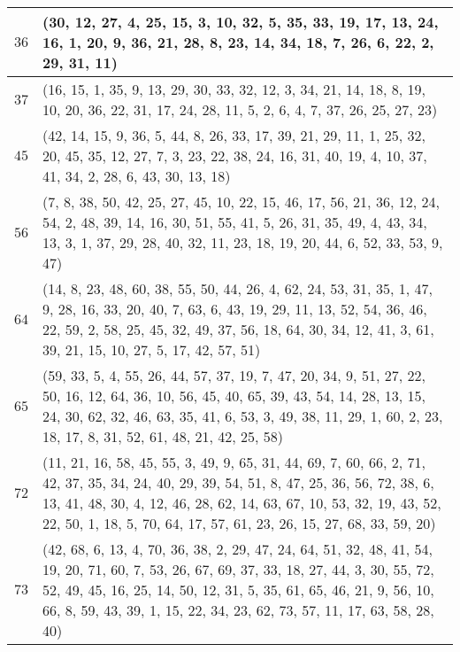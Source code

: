 \documentclass{article}
\theoremstyle{remark}
\theoremstyle{plain}
\begin{document}
\begin{appendices}
\begin{table}[H]
\begin{tabular}{ ||c p{14.3cm}|| }
    \hline
    
    $36$ & (30, 12, 27, 4, 25, 15, 3, 10, 32, 5, 35, 33, 19, 17, 13, 24, 16, 1, 20, 9, 36, 21, 28, 8, 23, 14, 34, 18, 7, 26, 6, 22, 2, 29, 31, 11) \\

    \hline
    
    $37$ & (16, 15, 1, 35, 9, 13, 29, 30, 33, 32, 12, 3, 34, 21, 14, 18, 8, 19, 10, 20, 36, 22, 31, 17, 24, 28, 11, 5, 2, 6, 4, 7, 37, 26, 25, 27, 23) \\

    \hline
    
    $45$ & (42, 14, 15, 9, 36, 5, 44, 8, 26, 33, 17, 39, 21, 29, 11, 1, 25, 32, 20, 45, 35, 12, 27, 7, 3, 23, 22, 38, 24, 16, 31, 40, 19, 4, 10, 37, 41, 34, 2, 28, 6, 43, 30, 13, 18) \\
    
    \hline
    
    $56$ & (7, 8, 38, 50, 42, 25, 27, 45, 10, 22, 15, 46, 17, 56, 21, 36, 12, 24, 54, 2, 48, 39, 14, 16, 30, 51, 55, 41, 5, 26, 31, 35, 49, 4, 43, 34, 13, 3, 1, 37, 29, 28, 40, 32, 11, 23, 18, 19, 20, 44, 6, 52, 33, 53, 9, 47) \\
    
    \hline
    
    $64$ & (14, 8, 23, 48, 60, 38, 55, 50, 44, 26, 4, 62, 24, 53, 31, 35, 1, 47, 9, 28, 16, 33, 20, 40, 7, 63, 6, 43, 19, 29, 11, 13, 52, 54, 36, 46, 22, 59, 2, 58, 25, 45, 32, 49, 37, 56, 18, 64, 30, 34, 12, 41, 3, 61, 39, 21, 15, 10, 27, 5, 17, 42, 57, 51)  \\
    
    \hline
    
    $65$ & (59, 33, 5, 4, 55, 26, 44, 57, 37, 19, 7, 47, 20, 34, 9, 51, 27, 22, 50, 16, 12, 64, 36, 10, 56, 45, 40, 65, 39, 43, 54, 14, 28, 13, 15, 24, 30, 62, 32, 46, 63, 35, 41, 6, 53, 3, 49, 38, 11, 29, 1, 60, 2, 23, 18, 17, 8, 31, 52, 61, 48, 21, 42, 25, 58)  \\
    
    \hline
    
    $72$ & (11, 21, 16, 58, 45, 55, 3, 49, 9, 65, 31, 44, 69, 7, 60, 66, 2, 71, 42, 37, 35, 34, 24, 40, 29, 39, 54, 51, 8, 47, 25, 36, 56, 72, 38, 6, 13, 41, 48, 30, 4, 12, 46, 28, 62, 14, 63, 67, 10, 53, 32, 19, 43, 52, 22, 50, 1, 18, 5, 70, 64, 17, 57, 61, 23, 26, 15, 27, 68, 33, 59, 20) \\
    
    \hline
    
    $73$ & (42, 68, 6, 13, 4, 70, 36, 38, 2, 29, 47, 24, 64, 51, 32, 48, 41, 54, 19, 20, 71, 60, 7, 53, 26, 67, 69, 37, 33, 18, 27, 44, 3, 30, 55, 72, 52, 49, 45, 16, 25, 14, 50, 12, 31, 5, 35, 61, 65, 46, 21, 9, 56, 10, 66, 8, 59, 43, 39, 1, 15, 22, 34, 23, 62, 73, 57, 11, 17, 63, 58, 28, 40) \\


\end{tabular}
\end{table}
\end{appendices}
\end{document}
